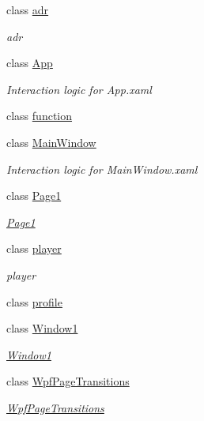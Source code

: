 \begin{DoxyCompactItemize}
\item 
class \hyperlink{class_project1__final_1_1adr}{adr}
\begin{DoxyCompactList}\small\item\em adr \end{DoxyCompactList}\item 
class \hyperlink{class_project1__final_1_1_app}{App}
\begin{DoxyCompactList}\small\item\em Interaction logic for App.\+xaml \end{DoxyCompactList}\item 
class \hyperlink{class_project1__final_1_1function}{function}
\item 
class \hyperlink{class_project1__final_1_1_main_window}{Main\+Window}
\begin{DoxyCompactList}\small\item\em Interaction logic for Main\+Window.\+xaml \end{DoxyCompactList}\item 
class \hyperlink{class_project1__final_1_1_page1}{Page1}
\begin{DoxyCompactList}\small\item\em \hyperlink{class_project1__final_1_1_page1}{Page1} \end{DoxyCompactList}\item 
class \hyperlink{class_project1__final_1_1player}{player}
\begin{DoxyCompactList}\small\item\em player \end{DoxyCompactList}\item 
class \hyperlink{class_project1__final_1_1profile}{profile}
\item 
class \hyperlink{class_project1__final_1_1_window1}{Window1}
\begin{DoxyCompactList}\small\item\em \hyperlink{class_project1__final_1_1_window1}{Window1} \end{DoxyCompactList}\item 
class \hyperlink{class_project1__final_1_1_wpf_page_transitions}{Wpf\+Page\+Transitions}
\begin{DoxyCompactList}\small\item\em \hyperlink{class_project1__final_1_1_wpf_page_transitions}{Wpf\+Page\+Transitions} \end{DoxyCompactList}\end{DoxyCompactItemize}
